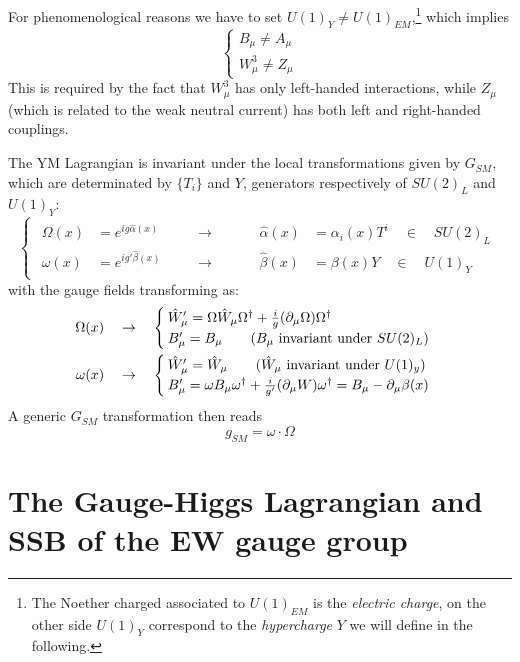 \documentclass[TheoreticalPhy_ModB.tex]{subfiles}
\begin{document}
For phenomenological reasons we have to set $U(1)_Y\neq U(1)_{EM}$,\footnote{The Noether charged associated to $U(1)_{EM}$ is the \emph{electric charge}, on the other side $U(1)_Y$ correspond to the \emph{hypercharge} $Y$ we will define in the following. } which implies
\[\begin{cases}
B_\mu\neq A_\mu\\
W_\mu^3\neq Z_\mu
\end{cases}\]
This is required by the fact that $W_\mu^3$ has only left-handed interactions, while $Z_\mu$ (which is related to the weak neutral current) has both left and right-handed couplings.

The YM Lagrangian is invariant under the local transformations given by $G_{SM}$, which are determinated by $\{T_i\}$ and $Y$, generators respectively of $SU(2)_L$ and $U(1)_Y$:
\[\begin{cases}\begin{aligned}
\Omega(x)&=e^{ig\hat\alpha(x)}\quad&&\to&&&\quad\hat\alpha(x)&=\alpha_i(x)T^i\quad\in\quad SU(2)_L\\
\omega(x)&=e^{ig'\hat\beta(x)}\quad&&\to&&&\quad\hat\beta(x)&=\beta(x)Y\quad\in\quad U(1)_Y
\end{aligned}\end{cases}\]
with the gauge fields transforming as:
\[\begin{aligned}
\Omega(x)\quad&\to\quad\begin{cases}
\hat W_\mu'=\Omega\hat W_\mu\Omega^\dagger+\frac ig(\partial_{\mu}\Omega)\Omega^\dagger\\
B_\mu'=B_\mu\qquad(B_\mu\text{ invariant under $SU(2)_L$})
\end{cases}	\\
\omega(x)\quad&\to\quad\begin{cases}
\hat W_\mu'=\hat W_\mu\qquad(\hat W_\mu\text{ invariant under $U(1)_y$})\\
B_\mu'=\omega B_\mu\omega^\dagger+\frac i{g'}(\partial_{\mu} W)\omega^\dagger=B_\mu-\partial_{\mu}\beta(x)
\end{cases}\end{aligned}\]
A generic $G_{SM}$ transformation then reads
\[g_{SM}=\omega\cdot\Omega\]


\section{The Gauge-Higgs Lagrangian and SSB of the EW gauge group}
\end{document}
